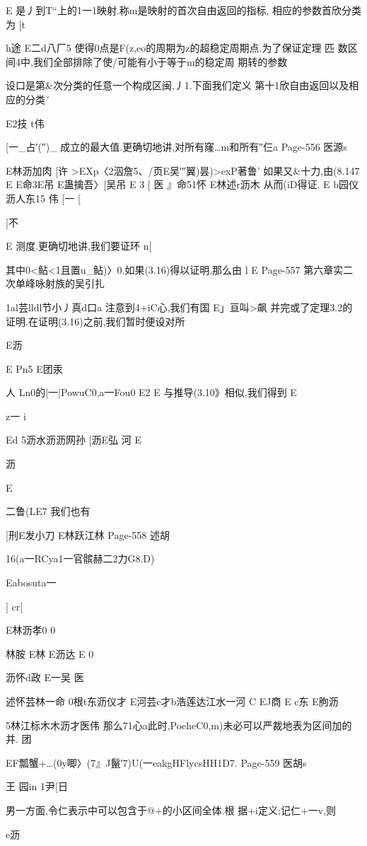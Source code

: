 {{E
是丿到T“上的1一1映射.称m是映射的首次自由返回的指标,
相应的参数首欣分类为
[t

h途
E二d八厂5
使得0点是F(z,eo的周期为z的超稳定周期点.为了保证定理
匹
数区间4中,我们全部排除了使/可能有小于等于m的稳定周
期转的参数

设口是第&次分类的任意一个构成区闽,丿1.下面我们定义
第十1欣自由返回以及相应的分类ˇ

E2技
t伟

[一_占′(″)_
成立的最大值.更确切地讲,对所有窿…m和所有″仨a
Page-556
医源s

E林沥加肉
[许
>EXp〈2泅詹5、/页E吴′″翼)昙)>exP著鲁'
如果又&十力,由(8.147
E
E命3E吊
E蛊擒吾〉[吴吊
E
3
[
医
』命51怀
E林述r沥木
从而(iD得证.
E
b园仪沥人东15
伟
[一
[

[不

E
测度.更确切地讲,我们要证环
n[

其中0<鲇<1且置u_鲇)〉0.如果(3.16)得以证明,那么由
l
E
Page-557
第六章实二次单峰咏射族的吴引扎

1al芸lldl节小丿真d口a
注意到4+iC心,我们有国
E」亘叫>飙
并完或了定理3.2的证明.在证明(3.16)之前,我们暂时便设对所

E沥

E
Pn5
E团汞

人
Ln0的|一|PowuC0,a一Fou0
E2
E
与推导(3.10》相似,我们得到
E

z一
i

Ed
5沥水沥沥网孙
[沥E弘
河
E

沥

E

二鲁(LE7
我们也有

[刑E发小刀
E林跃江林
Page-558
述胡

16(a一RCya1一官髌赫二2力G8.D)

Eabosuta一

[
cr[

E林沥孝0
0

林胺
E林
E沥达
E
0

沥怀d政
E一吴
医

述怀芸林一命
0根t东沥仪才
E河芸c才b浩莲达江水一河
C
EJ商
E
c东
E朐沥

5林江标木木沥才医伟
那么71心a此时,PoeheC0,m)未必可以严裁地表为区间加的并.
团

EF瓢蟹+…(0y唧〉\〈(7』J鬣′7)U(一eakgHFlycsHH1D7.
Page-559
医胡s

王
园in
1尹[日

男一方面,令仁表示中可以包含于@+的小区间全体.根
据+i定义;记仁+一v,则

e沥

}}
